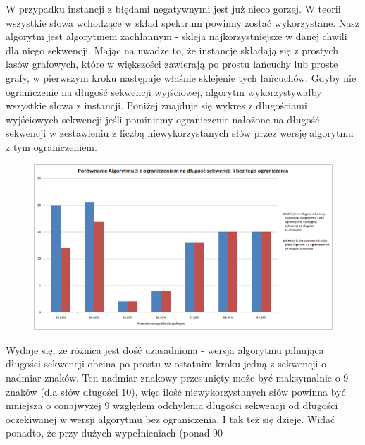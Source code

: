 \documentclass[a4paper,10pt]{article}
\begin{document}
W przypadku instancji z błędami negatywnymi jest już nieco gorzej. W teorii wszystkie słowa wchodzące w skład spektrum powinny zostać wykorzystane. Nasz algorytm jest algorytmem zachłannym - skleja najkorzystniejsze w danej chwili dla niego sekwencji. Mając na uwadze to, że instancje składają się z prostych lasów grafowych, które w większości zawierają po prostu łańcuchy lub proste grafy, w pierwszym kroku następuje właśnie sklejenie tych łańcuchów. Gdyby nie ograniczenie na długość sekwencji wyjściowej, algorytm wykorzystywałby wszystkie słowa z instancji. Poniżej znajduje się wykres z długościami wyjściowych sekwencji jeśli pominiemy ograniczenie nałożone na długość sekwencji w zestawieniu z liczbą niewykorzystanych słów przez wersję algorytmu z tym ograniczeniem.

\begin{figure}[h]
  \footnotesize\centering
  \includegraphics[width=\textwidth,keepaspectratio]{withoutNConstraint_general_negative.png}
\end{figure}

Wydaje się, że różnica jest dość uzasadniona - wersja algorytmu pilnująca długości sekwencji obcina po prostu w ostatnim kroku jedną z sekwencji o nadmiar znaków. Ten nadmiar znakowy przesunięty może być maksymalnie o 9 znaków (dla słów długości 10), więc ilość niewykorzystanych słów powinna być mniejsza o conajwyżej 9 względem odchylenia długości sekwencji od długości oczekiwanej w wersji algorytmu bez ograniczenia. I tak też się dzieje. Widać ponadto, że przy dużych wypełnieniach (ponad 90%
\end{document}
